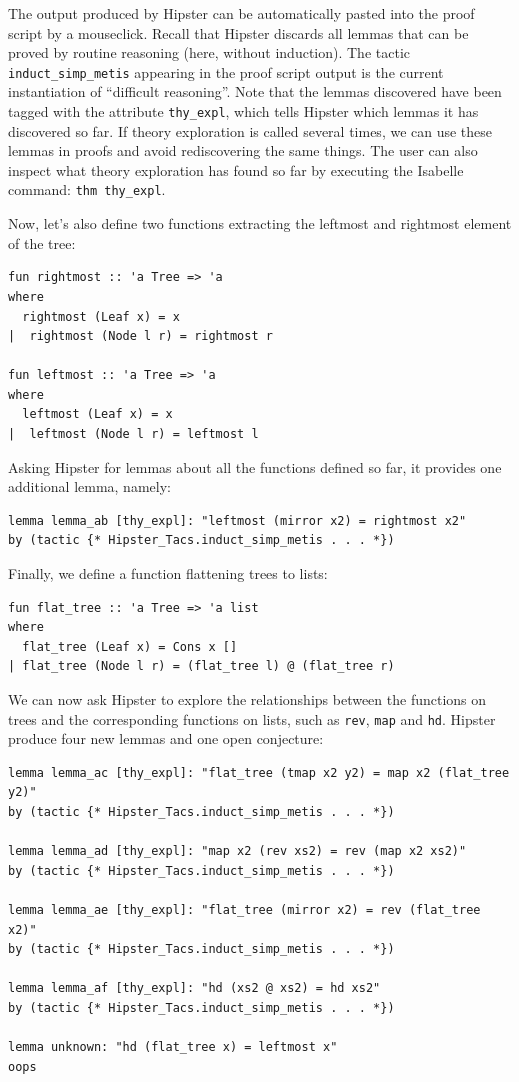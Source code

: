 The output produced by Hipster can be automatically pasted into the proof script by a mouseclick. Recall that Hipster discards all lemmas that can be proved by routine reasoning (here, without induction). The tactic \texttt{induct\_simp\_metis} appearing in the proof script output is the current instantiation of ``difficult reasoning''. Note that the lemmas discovered have been tagged with the attribute \texttt{thy\_expl}, which tells Hipster which lemmas it has discovered so far. If theory exploration is called several times, we can use these lemmas in proofs and avoid rediscovering the same things. The user can also inspect what theory exploration has found so far by executing the Isabelle command: \texttt{thm thy\_expl}.

Now, let's also define two functions extracting the leftmost and rightmost element of the tree:
\begin{small}
\begin{verbatim}
fun rightmost :: 'a Tree => 'a
where 
  rightmost (Leaf x) = x
|  rightmost (Node l r) = rightmost r

fun leftmost :: 'a Tree => 'a
where 
  leftmost (Leaf x) = x
|  leftmost (Node l r) = leftmost l
\end{verbatim}
\end{small}
Asking Hipster for lemmas about all the functions defined so far, it provides one additional lemma, namely:
\begin{small}
\begin{verbatim}
lemma lemma_ab [thy_expl]: "leftmost (mirror x2) = rightmost x2"
by (tactic {* Hipster_Tacs.induct_simp_metis . . . *})
\end{verbatim}
\end{small}
Finally, we define a function flattening trees to lists:
\begin{small}
\begin{verbatim}
fun flat_tree :: 'a Tree => 'a list
where
  flat_tree (Leaf x) = Cons x []
| flat_tree (Node l r) = (flat_tree l) @ (flat_tree r)
\end{verbatim}
\end{small}
We can now ask Hipster to explore the relationships between the functions on trees and the corresponding functions on lists, such as \texttt{rev}, \texttt{map} and \texttt{hd}. Hipster produce four new lemmas and one open conjecture:
\begin{small}
\begin{verbatim}
lemma lemma_ac [thy_expl]: "flat_tree (tmap x2 y2) = map x2 (flat_tree y2)"
by (tactic {* Hipster_Tacs.induct_simp_metis . . . *})

lemma lemma_ad [thy_expl]: "map x2 (rev xs2) = rev (map x2 xs2)"
by (tactic {* Hipster_Tacs.induct_simp_metis . . . *})

lemma lemma_ae [thy_expl]: "flat_tree (mirror x2) = rev (flat_tree x2)"
by (tactic {* Hipster_Tacs.induct_simp_metis . . . *})

lemma lemma_af [thy_expl]: "hd (xs2 @ xs2) = hd xs2"
by (tactic {* Hipster_Tacs.induct_simp_metis . . . *})

lemma unknown: "hd (flat_tree x) = leftmost x"
oops
\end{verbatim}
\end{small}
